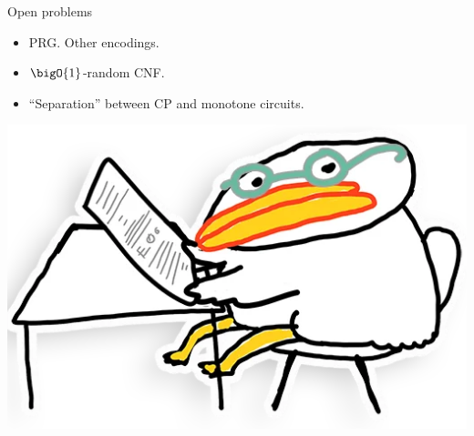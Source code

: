 \begin{frame}{Open problems}

    \begin{itemize}
        \item PRG. Other encodings.
        \item $\bigO{1}$-random CNF.
        \item ``Separation'' between CP and monotone circuits.
    \end{itemize}

    \vspace{1cm}
    \centering
    \includegraphics[scale = 0.1]{pics/utia-think.png}
\end{frame}